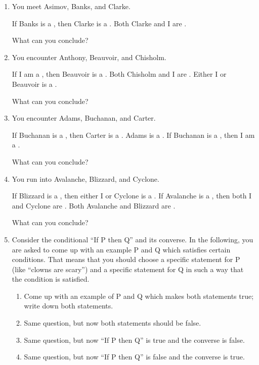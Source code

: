 \probsec{~\ref{sec:conditionals}}
\begin{enumerate}
    \item You meet Asimov, Banks, and Clarke.
  \begin{dialogue}
     If Banks is a \knight, then Clarke is a \knave.
     Both Clarke and I are \knaves.
  \end{dialogue}
  What can you conclude?

    \item You encounter Anthony, Beauvoir, and Chisholm.
  \begin{dialogue}
     If I am a \knave, then Beauvoir is a \knight.
     Both Chisholm and I are \knights.
     Either I or Beauvoir is a \knave.
  \end{dialogue}
  What can you conclude?

    \item You encounter Adams, Buchanan, and Carter.
  \begin{dialogue}
     If Buchanan is a \knight, then Carter is a \knave.
     Adams is a \knave.
     If Buchanan is a \knight, then I am a \knave.
  \end{dialogue}
  What can you conclude?

    \item You run into Avalanche, Blizzard, and Cyclone.
  \begin{dialogue}
     If Blizzard is a \knight, then either I or Cyclone is a \knave.
     If Avalanche is a \knave, then both I and Cyclone are \knights.
     Both Avalanche and Blizzard are \knaves.
  \end{dialogue}
  What can you conclude?

    \item Consider the conditional ``If P then Q'' and its converse. In the following, you are asked to come up with an example P and Q which satisfies certain conditions. That means that you should choose a specific statement for P (like ``clowns are scary'') and a specific statement for Q in such a way that the condition is satisfied.
  \begin{enumerate}
      \item Come up with an example of P and Q which makes both statements true; write down both statements.
      \item Same question, but now both statements should be false.
      \item Same question, but now ``If P then Q'' is true and the converse is false.
      \item Same question, but now ``If P then Q'' is false and the converse is true.
  \end{enumerate}
\end{enumerate}

